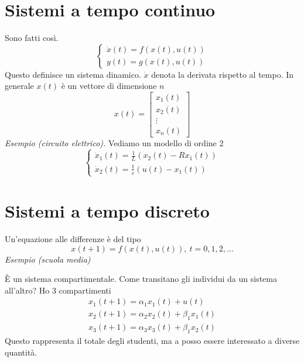 \documentclass[10pt,a4paper]{book}
\begin{document}
\section{Sistemi a tempo continuo}

Sono fatti così.
\begin{equation*}
\boxed{\begin{cases}
\dot{x} (t)=f(x(t),u(t))\\
y(t)=g(x(t),u( t) )
\end{cases}}
\end{equation*}
Questo definisce un sistema dinamico. $\dot{x}$ denota la derivata rispetto al tempo. In generale $x( t)$ è un vettore di dimensione $n$
\begin{equation*}
x( t) =\begin{bmatrix}
x_{1}( t)\\
x_{2}( t)\\
\vdots \\
x_{n}( t)
\end{bmatrix}
\end{equation*}
\textit{Esempio (circuito elettrico).} Vediamo un modello di ordine 2
\begin{equation*}
\begin{cases}
\dot{x}_{1} (t)=\frac{1}{L}( x_{2} (t)-Rx_{1} (t))\\
\dot{x}_{2} (t)=\frac{1}{c}( u(t)-x_{1} (t))
\end{cases}
\end{equation*}
\section{Sistemi a tempo discreto}

Un'equazione alle differenze è del tipo
\begin{equation*}
x( t+1) =f( x( t) ,u( t)) ,\ t=0,1,2,\dotsc 
\end{equation*}
\textit{Esempio (scuola media)}

È un sistema compartimentale. Come transitano gli individui da un sistema all'altro? Ho 3 compartimenti
\begin{equation*}
\begin{array}{ l }
x_{1} (t+1)=\alpha _{1} x_{1} (t)+u(t)\\
x_{2} (t+1)=\alpha _{2} x_{2} (t)+\beta _{1} x_{1} (t)\\
x_{3} (t+1)=\alpha _{3} x_{3} (t)+\beta _{1} x_{2} (t)
\end{array}
\end{equation*}
Questo rappresenta il totale degli studenti, ma a posso essere interessato a diverse quantità.
\end{document}
